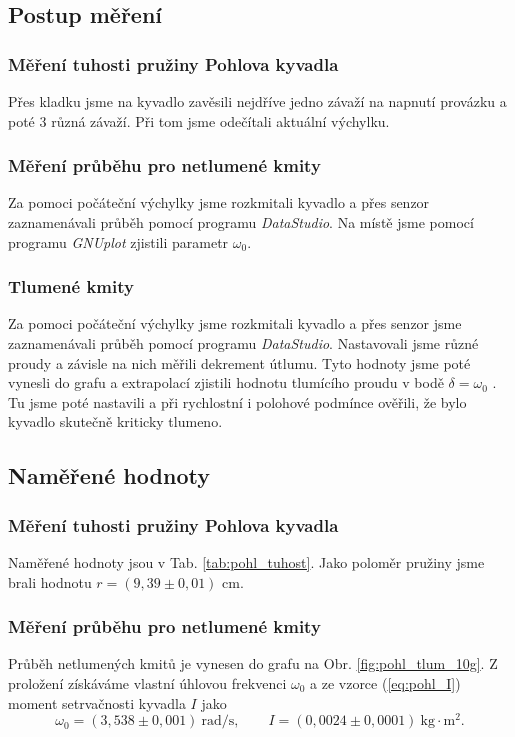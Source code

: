 \documentclass[english]{article}
\newcommand{\unit}[1]{\mathrm{#1}}
\begin{document}
\subsection{Postup měření}
	\subsubsection{Měření tuhosti pružiny Pohlova kyvadla}
		Přes kladku jsme na kyvadlo zavěsili nejdříve jedno závaží na napnutí provázku a poté 3 různá závaží. Při tom jsme odečítali aktuální výchylku.
		
	\subsubsection{Měření průběhu pro netlumené kmity}
		Za pomoci počáteční výchylky jsme rozkmitali kyvadlo a přes senzor zaznamenávali průběh pomocí programu \emph{DataStudio}. Na místě jsme pomocí programu \emph{GNUplot} zjistili parametr $\omega_0$.
	
	\subsubsection{Tlumené kmity}
		Za pomoci počáteční výchylky jsme rozkmitali kyvadlo a přes senzor jsme zaznamenávali průběh pomocí programu \emph{DataStudio}. Nastavovali jsme různé proudy a závisle na nich měřili dekrement útlumu. Tyto hodnoty jsme poté vynesli do grafu a extrapolací zjistili hodnotu tlumícího proudu v bodě $\delta = \omega_0$ . Tu jsme poté nastavili a při rychlostní i polohové podmínce ověřili, že bylo kyvadlo skutečně kriticky tlumeno.
\subsection{Naměřené hodnoty}
    
    \subsubsection{Měření tuhosti pružiny Pohlova kyvadla}
    Naměřené hodnoty jsou v Tab. \ref{tab:pohl_tuhost}. Jako poloměr pružiny jsme brali hodnotu $r = (9,39\pm0,01)$ cm.
    		
    	
   	
   	\subsubsection{Měření průběhu pro netlumené kmity}
		Průběh netlumených kmitů je vynesen do grafu na Obr. \ref{fig:pohl_tlum_10g}. Z proložení získáváme vlastní úhlovou frekvenci $\omega_0$ a ze vzorce (\ref{eq:pohl_I}) moment setrvačnosti kyvadla $I$ jako
		\begin{equation}
		\omega_{0} = (3,538\pm0,001)\ \unit{rad/s}, \qquad I = (0,0024\pm0,0001)\ \unit{kg \cdot m^2}.
		\end{equation}	   		
   	
\end{document}
